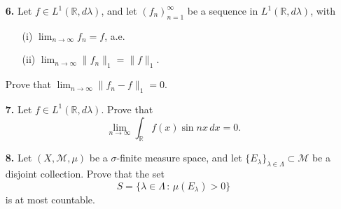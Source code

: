 \documentclass[12pt]{article}
\newcommand{\R}{\mathbb{R} }
\begin{document}
\begin{itemize}
\item[{\bf 6.}] Let $f\in L^1(\R,d\lambda)$, and
let $(f_n)_{n=1}^\infty$ be a sequence in $L^1(\R,d\lambda)$, with
\begin{itemize}
\item[(i)] $\lim_{n\to\infty}f_n=f$, a.e.
\item[(ii)] $\lim_{n\to\infty}\|f_n\|_1=\|f\|_1$.
\end{itemize}
Prove that $\lim_{n\to\infty}\|f_n-f\|_1=0$.

\item[{\bf 7.}] Let $f\in L^1(\R,d\lambda)$. Prove that
$$
\lim_{n\to\infty}\int_\R f(x)\sin nx\,dx=0.$$

\item[{\bf 8.}] Let $(X,\mathcal{M},\mu)$ be a $\sigma$-finite
measure space, and let $\{E_\lambda\}_{\lambda\in\Lambda}\subset
\mathcal{M}$ be a disjoint collection.
Prove that the set
$$
S=\{\lambda\in\Lambda\,:\,\mu(E_\lambda)>0\}$$
is at most countable.
\end{itemize}
\end{document}
